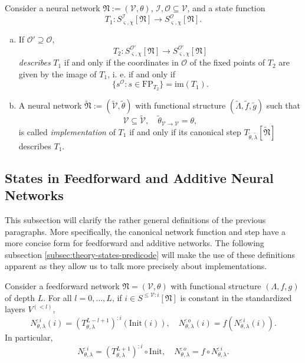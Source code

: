 \documentclass[a4paper,11pt]{report}
\newcommand{\const}{\varsigma} %
\newcommand{\var}{\chi} %
\newcommand{\In}{\text{Init}}
\begin{document}
\begin{Def}[Implementations]
Consider a neural network $\mathfrak{N}:=(\mathcal{V},\theta)$, $\mathcal{I},\mathcal{O}\subseteq\mathcal{V}$, and a state function
\[
T_1:S^{\mathcal{I}}_{\const,\var}[\mathfrak{N}]\to S^{\mathcal{O}}_{\const,\var}[\mathfrak{N}].
\]
\begin{enumerate}[a)]
\item
If $\mathcal{O}'\supseteq\mathcal{O}$, 
\[
T_2:S^{\mathcal{O}'}_{\const,\var}[\mathfrak{N}]\to S^{\mathcal{O}'}_{\const,\var}[\mathfrak{N}]
\]
\emph{describes} $T_1$ if and only if the coordinates in $\mathcal{O}$ of the fixed points of $T_2$ are given by the image of $T_1$, i. e. if and only if 
\[
\{s^{\mathcal{O}}:s\in \text{FP}_{T_2}\}=\text{im}(T_1).
\]
\item
A neural network $\tilde{\mathfrak{N}}:=(\tilde{\mathcal{V}},\tilde{\theta})$ with functional structure $(\tilde{\Lambda},\tilde{f},\tilde{g})$ such that
\[
\mathcal{V}\subseteq\tilde{\mathcal{V}},
\quad
\tilde{\theta}_{\mathcal{V}\to\mathcal{V}}=\theta,
\]
is called \emph{implementation} of $T_1$ if and only if its canonical step $T_{\tilde{\theta},\tilde{\lambda}}[\tilde{\mathfrak{N}}]$ describes $T_1$.
\end{enumerate}
\end{Def}

\subsection{States in Feedforward and Additive Neural Networks}\label{subsec:theory-states-add}

\begin{Par}
This subsection will clarify the rather general definitions of the previous paragraphs. More specifically, the canonical network function and step have a more concise form for feedforward and additive networks. The following subsection \ref{subsec:theory-states-predicode} will make the use of these definitions apparent as they allow us to talk more precisely about implementations.
\end{Par}

\begin{Pro}
Consider a feedforward network $\mathfrak{N}=(\mathcal{V},\theta)$ with functional structure $(\Lambda,f,g)$ of depth $L$.
For all $l=0,\dotsc,L$, if $i\in S^{\le\mathcal{V}:i}[\mathfrak{N}]$ is constant in the standardized layers $V^{(<l)}$, 
\begin{equation}
N_{\theta,\lambda}^{:i}(i)=\left(T_{\theta,\lambda}^{L-l+1}\right)^{:i}\left(\In(i)\right),
\quad
N_{\theta,\lambda}^{:o}(i)=f\left(N_{\theta,\lambda}^{:i}(i)\right).
\end{equation}
In particular, 
\begin{equation}
N_{\theta,\lambda}^{:i}=\left(T_{\theta,\lambda}^{L+1}\right)^{:i}\circ\In, 
\quad
N_{\theta,\lambda}^{:o}=f\circ N_{\theta,\lambda}^{:i}.
\end{equation}
\end{Pro}
\end{document}
